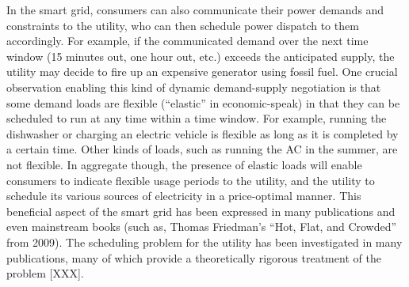 \documentclass[conference]{IEEEtran}
\begin{document}
In the smart grid, consumers can also communicate their power demands and constraints to the utility, who can then schedule
power dispatch to them accordingly.  For example, if the communicated demand over the next time window (15 minutes out, one hour out, etc.) exceeds the anticipated supply, the utility may decide to fire up an expensive generator using fossil fuel. One crucial observation enabling this kind of dynamic demand-supply negotiation is that some demand loads are flexible (``elastic'' in economic-speak) in that they can be scheduled to run at any time within a time window. For example, running the dishwasher or charging an electric vehicle is flexible as long as it is completed by a certain time. Other kinds of loads, such as running the AC in the summer, are not flexible. In aggregate though, the presence of elastic loads will enable consumers to indicate flexible usage periods to the utility, and the utility to schedule its various sources of electricity in a price-optimal manner. This beneficial aspect of the smart grid has been expressed in many publications and even mainstream books (such as, Thomas Friedman's ``Hot, Flat, and Crowded'' from 2009). The scheduling problem for the utility has been investigated in many publications, many of which provide a theoretically rigorous treatment of the problem [XXX]. 

\end{document}
